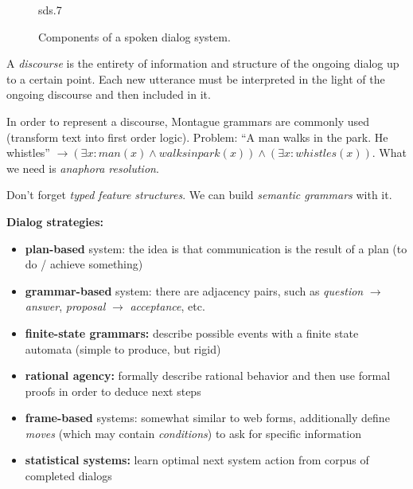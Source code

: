 \documentclass[11pt]{article}
\begin{document}
\begin{figure}[htb]
    \begin{minipage}{\linewidth}
        \vspace{5cm}
        \hfill \scriptsize sds.7
    \end{minipage}
    \caption{\label{figureA} Components of a spoken dialog system.}
\end{figure}

A \textit{discourse} is the entirety of information and structure of the ongoing dialog up to a certain point. Each new utterance must be interpreted in the light of the ongoing discourse and then included in it.

\vspace{5pt}

In order to represent a discourse, Montague grammars are commonly used (transform text into first order logic). Problem: ``A man walks in the park. He whistles'' $\rightarrow (\exists x : man(x) \wedge walksinpark(x)) \wedge (\exists x : whistles(x))$. What we need is \textit{anaphora resolution}.

\vspace{5pt}

Don't forget \textit{typed feature structures}. We can build \textit{semantic grammars} with it.

\vspace{5pt}

\textbf{Dialog strategies:}
\begin{itemize}
    \item \textbf{plan-based} system: the idea is that communication is the result of a plan (to do / achieve something)
    \item \textbf{grammar-based} system: there are adjacency pairs, such as \textit{question} $\rightarrow$ \textit{answer}, \textit{proposal} $\rightarrow$ \textit{acceptance}, etc.
    \item \textbf{finite-state grammars:} describe possible events with a finite state automata (simple to produce, but rigid)
    \item \textbf{rational agency:} formally describe rational behavior and then use formal proofs in order to deduce next steps
    \item \textbf{frame-based} systems: somewhat similar to web forms, additionally define \textit{moves} (which may contain \textit{conditions}) to ask for specific information
    \item \textbf{statistical systems:} learn optimal next system action from corpus of completed dialogs
\end{itemize}
\end{document}
